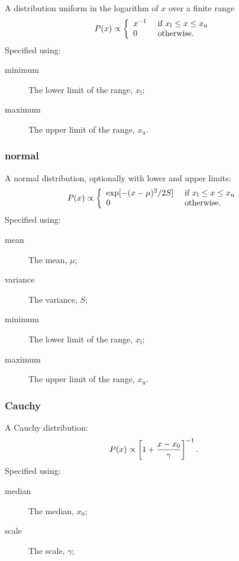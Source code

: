 A distribution uniform in the logarithm of $x$ over a finite range
\begin{equation}
P(x) \propto \left\{ \begin{array}{ll} x^{-1} & \hbox{ if } x_{\mathrm l} \leq x \leq x_{\mathrm u} \\ 0 & \hbox{ otherwise.}  \end{array} \right.
\end{equation}
Specified using:
\begin{description}
\item[{\normalfont \ttfamily minimum}] The lower limit of the range, $x_{\mathrm l}$;
\item[{\normalfont \ttfamily maximum}] The upper limit of the range, $x_{\mathrm u}$.
\end{description}

\subsubsection{{\normalfont \ttfamily normal}}

A normal distribution, optionally with lower and upper limits:
\begin{equation}
P(x) \propto \left\{ \begin{array}{ll} \exp[-(x-\mu)^2/2S] & \hbox{ if } x_{\mathrm l} \leq x \leq x_{\mathrm u} \\ 0 & \hbox{ otherwise.}  \end{array} \right.
\end{equation}
Specified using:
\begin{description}
\item[{\normalfont \ttfamily mean}] The mean, $\mu$;
\item[{\normalfont \ttfamily variance}] The variance, $S$;
\item[{\normalfont \ttfamily minimum}] The lower limit of the range, $x_{\mathrm l}$;
\item[{\normalfont \ttfamily maximum}] The upper limit of the range, $x_{\mathrm u}$.
\end{description}

\subsubsection{{\normalfont \ttfamily Cauchy}}

A Cauchy distribution:
\begin{equation}
P(x) \propto \left[1+{x-x_0\over\gamma}\right]^{-1}.
\end{equation}
Specified using:
\begin{description}
\item[{\normalfont \ttfamily median}] The median, $x_0$;
\item[{\normalfont \ttfamily scale}] The scale, $\gamma$;
\end{description}

